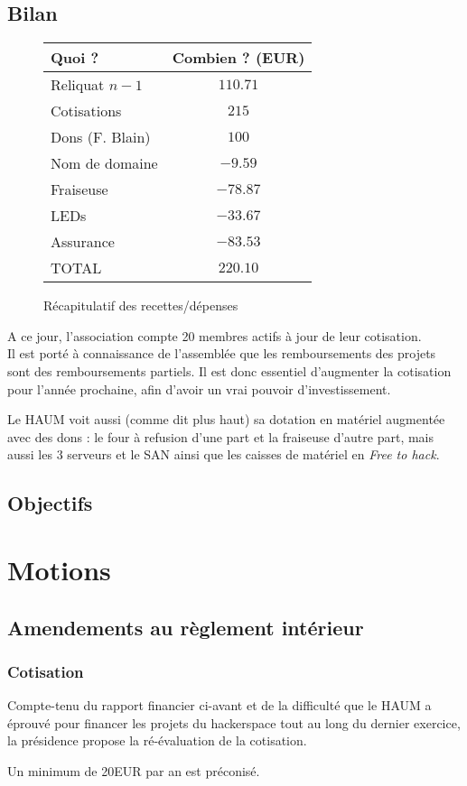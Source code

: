 \documentclass[11pt]{article}
\begin{document}
\subsection{Bilan}

\begin{figure}[h]
\centering
\begin{tabular}{l|c}
Quoi ? & Combien ? (EUR)  \\\hline
Reliquat $n-1$ & $110.71$\\
Cotisations & $215$ \\
Dons (F. Blain) & $100$ \\
Nom de domaine & $-9.59$\\
Fraiseuse & $-78.87$\\
LEDs & $-33.67$\\
Assurance & $-83.53$\\\hline\hline
TOTAL & $220.10$\\
\end{tabular}
\caption{Récapitulatif des recettes/dépenses}
\end{figure}

A ce jour, l'association compte 20 membres actifs à jour de leur cotisation. \\

Il est porté à connaissance de l'assemblée que les remboursements des projets sont des remboursements partiels. Il est donc essentiel d'augmenter la cotisation pour l'année prochaine, afin d'avoir un vrai pouvoir d'investissement.

Le HAUM voit aussi (comme dit plus haut) sa dotation en matériel augmentée avec des dons : le four à refusion d'une part
et la fraiseuse d'autre part, mais aussi les 3 serveurs et le SAN ainsi que les caisses de matériel en \textit{Free to
hack}.

\subsection{Objectifs}


\section{Motions}

\subsection{Amendements au règlement intérieur}

\subsubsection{Cotisation}

Compte-tenu du rapport financier ci-avant et de la difficulté que le HAUM a éprouvé pour financer les projets du hackerspace tout au long du dernier exercice, la présidence propose la ré-évaluation de la cotisation.

Un minimum de 20EUR par an est préconisé.
\end{document}
